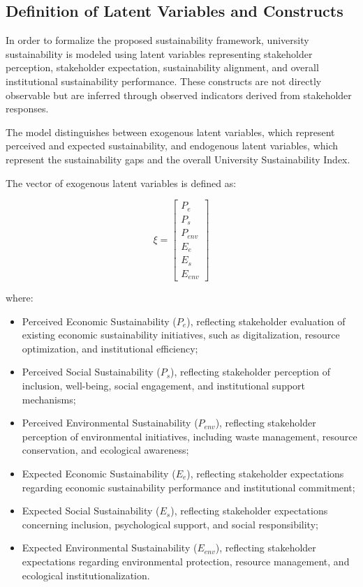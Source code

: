 \documentclass[11pt,a4paper]{article}
\begin{document}
\subsection{Definition of Latent Variables and Constructs}

In order to formalize the proposed sustainability framework, university sustainability is modeled using latent variables representing stakeholder perception, stakeholder expectation, sustainability alignment, and overall institutional sustainability performance. These constructs are not directly observable but are inferred through observed indicators derived from stakeholder responses.

The model distinguishes between exogenous latent variables, which represent perceived and expected sustainability, and endogenous latent variables, which represent the sustainability gaps and the overall University Sustainability Index.

The vector of exogenous latent variables is defined as:

\begin{equation}
\xi =
\begin{bmatrix}
P_e \\
P_s \\
P_{env} \\
E_e \\
E_s \\
E_{env}
\end{bmatrix}
\end{equation}

where:

\begin{itemize}
\item Perceived Economic Sustainability ($P_e$), reflecting stakeholder evaluation of existing economic sustainability initiatives, such as digitalization, resource optimization, and institutional efficiency;
\item Perceived Social Sustainability ($P_s$), reflecting stakeholder perception of inclusion, well-being, social engagement, and institutional support mechanisms;
\item Perceived Environmental Sustainability ($P_{env}$), reflecting stakeholder perception of environmental initiatives, including waste management, resource conservation, and ecological awareness;
\item Expected Economic Sustainability ($E_e$), reflecting stakeholder expectations regarding economic sustainability performance and institutional commitment;
\item Expected Social Sustainability ($E_s$), reflecting stakeholder expectations concerning inclusion, psychological support, and social responsibility;
\item Expected Environmental Sustainability ($E_{env}$), reflecting stakeholder expectations regarding environmental protection, resource management, and ecological institutionalization.
\end{itemize}
\end{document}
